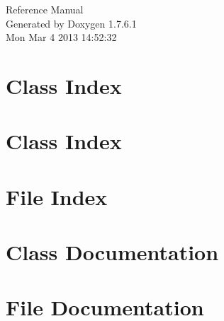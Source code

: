 \documentclass[a4paper]{book}
\begin{document}
\hypersetup{pageanchor=false,citecolor=blue}
\begin{titlepage}
\vspace*{7cm}
\begin{center}
{\Large \-Reference \-Manual}\\
\vspace*{1cm}
{\large \-Generated by Doxygen 1.7.6.1}\\
\vspace*{0.5cm}
{\small Mon Mar 4 2013 14:52:32}\\
\end{center}
\end{titlepage}
\clearemptydoublepage
{}
\tableofcontents
\clearemptydoublepage
{}
\hypersetup{pageanchor=true,citecolor=blue}
\chapter{\-Class \-Index}

\chapter{\-Class \-Index}

\chapter{\-File \-Index}

\chapter{\-Class \-Documentation}






















\chapter{\-File \-Documentation}
































\printindex
\end{document}
